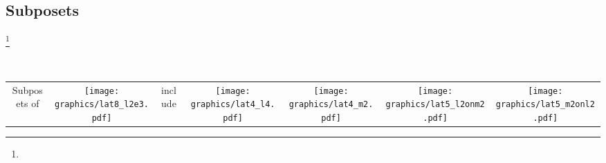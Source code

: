 \subsection{Subposets}
\begin{definition}
\footnote{
  }
\label{def:subposet}
\end{definition}


\begin{example}
\mbox{}\\%
\begin{tabular}{ccccccc}
  \parbox[c][\tw/8][c]{3\tw/16}{Subposets of\\\vspace{3ex}}
  &\texttt{[image: graphics/lat8\_l2e3.pdf]}
  & 
  \parbox[c][\tw/8][c]{2\tw/16}{include\\\vspace{3ex}}
  &\texttt{[image: graphics/lat4\_l4.pdf]}
  &\texttt{[image: graphics/lat4\_m2.pdf]}
  &\texttt{[image: graphics/lat5\_l2onm2.pdf]}
  &\texttt{[image: graphics/lat5\_m2onl2.pdf]}
\end{tabular}
\end{example}

